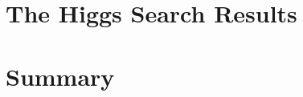 \documentclass{cmspaper}
\begin{document}

\section{The Higgs Search Results}
   \label{sec:dataresults}

\section{Summary}
     \label{sec:summary}



\clearpage 
\appendix
\appendixpage


\end{document}
